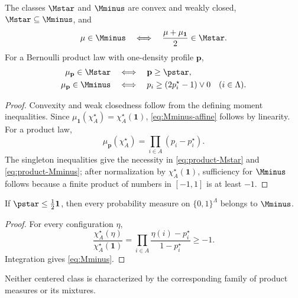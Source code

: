 \begin{proposition}
\label{prop:centered-classes}
The classes \(\Mstar\) and \(\Mminus\) are convex and weakly closed,
\(\Mstar\subseteq\Mminus\), and
\begin{equation}
  \mu\in\Mminus
  \quad\Longleftrightarrow\quad
  \frac{\mu+\mu_{\mathbf1}}2\in\Mstar.
  \label{eq:Mminus-affine}
\end{equation}
For a Bernoulli product law with one-density profile \(\mathbf p\),
\begin{align}
  \mu_{\mathbf p}\in\Mstar
  &\quad\Longleftrightarrow\quad
  \mathbf p\ge\pstar,
  \label{eq:product-Mstar}
  \\
  \mu_{\mathbf p}\in\Mminus
  &\quad\Longleftrightarrow\quad
  p_i\ge(2p_i^\star-1)\vee0
  \quad(i\in\Lambda).
  \label{eq:product-Mminus}
\end{align}
\end{proposition}

\begin{proof}
Convexity and weak closedness follow from the defining moment
inequalities. Since
\(\mu_{\mathbf1}(\chi_A^\star)=\chi_A^\star(\mathbf1)\),
\eqref{eq:Mminus-affine} follows by linearity. For a product law,
\[
  \mu_{\mathbf p}(\chi_A^\star)
  =
  \prod_{i\in A}(p_i-p_i^\star).
\]
The singleton inequalities give the necessity in
\eqref{eq:product-Mstar} and \eqref{eq:product-Mminus}; after normalization by
\(\chi_A^\star(\mathbf1)\), sufficiency for \(\Mminus\) follows because
a finite product of numbers in \([-1,1]\) is at least \(-1\).
\end{proof}

\begin{lemma}
\label{lem:all-measures-Mminus}
If \(\pstar\le\frac12\mathbf1\), then every probability measure on
\(\{0,1\}^{\Lambda}\) belongs to \(\Mminus\).
\end{lemma}

\begin{proof}
For every configuration \(\eta\),
\[
  \frac{\chi_A^\star(\eta)}
       {\chi_A^\star(\mathbf1)}
  =
  \prod_{i\in A}
  \frac{\eta(i)-p_i^\star}{1-p_i^\star}
  \ge-1.
\]
Integration gives \eqref{eq:Mminus}.
\end{proof}

\begin{remark}
\label{rem:centered-classes-not-mixtures}
Neither centered class is characterized by the corresponding family of
product measures or its mixtures.
\end{remark}
